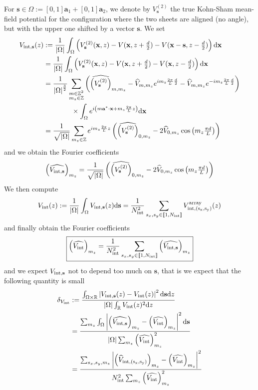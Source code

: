 \documentclass[11pt,a4paper,reqno,french,tikz]{amsart}
\def\d{{\rm d}}
\newcommand{\intent}[1]{\llbracket #1 \rrbracket}
\newcommand{\pa}[1]{\left( #1 \right)} %
\newcommand{\ab}[1]{\left|#1\right|} %
\newcommand{\f}[2]{\frac{#1}{#2}} %
\newcommand{\ind}[1]{_{\textup{#1}}} %
\def\ba{{\mathbf a}}
\def\bx{{\mathbf x}}
\def\bs{{\mathbf s}}
\newcommand{\dd}{\tfrac{d}{2}}
\begin{document}
For $\bs \in \Omega := [0,1] \ba_1 + [0,1] \ba_2$, we denote by $V^{(2)}_{\bs}$ the true Kohn-Sham mean-field potential for the configuration where the two sheets are aligned (no angle), but with the upper one shifted by a vector $\bs$. We set
\begin{align*}
	V_{\rm int, \bs}(z) &:= \f{1}{\ab{\Omega}} \int_{\Omega}  \left( V^{(2)}_{\bs}(\bx, z) - V(\bx, z + \dd) - V(\bx - \bs, z -\dd)   \right) \d \bx \\
	&= \f{1}{\ab{\Omega}} \int_{\Omega}  \left( V^{(2)}_{\bs}(\bx, z) - V(\bx, z + \dd) - V(\bx, z -\dd)   \right) \d \bx \\
    &= \f{1}{\ab{\Omega}^{\f 32}} \sum_{\substack{m \in \Z^2 \\ m_z \in \Z}}  \pa{ \widehat{\pa{V^{(2)}_{\bs}}}_{m,m_z} - \widehat{V}_{m,m_z}e^{i m_z \f{2\pi}{L} \f{d}{2}} -\widehat{V}_{m,m_z} e^{-i m_z \f{2\pi}{L} \f{d}{2}}} \\
    &\qquad \qquad \times \int_{\Omega} e^{i \pa{m \ba^* \cdot \bx + m_z \f{2\pi}{L} z}}\d \bx \\
    &= \f{1}{\sqrt{\ab{\Omega}}}\sum_{\substack{m_z \in \Z}} e^{i  m_z \f{2\pi}{L} z} \pa{ \widehat{\pa{V^{(2)}_{\bs}}}_{0,m_z} - 2 \widehat{V}_{0,m_z} \cos\pa{ m_z \tfrac{\pi d}{L} }}
\end{align*}
and we obtain the Fourier coefficients
\begin{align*}
\pa{\widehat{V_{\rm{int},\bs}}}_{m_z} =\f{1}{\sqrt{\ab{\Omega}}} \pa{\widehat{\pa{V^{(2)}_{\bs}}}_{0,m_z} - 2 \widehat{V}_{0,m_z} \cos\pa{ m_z \tfrac{\pi d}{L} }}
\end{align*}
We then compute
\begin{align*}
V\ind{int}(z) := \f{1}{\ab{\Omega}} \int_\Omega V_{\rm int, \bs}(z) \d \bs = \f{1}{N\ind{int}^2} \sum_{\substack{s_x,s_y \in \intent{1,N\ind{int}}}} V^{\rm{array}}_{\rm int, (s_x,s_y)}(z)
\end{align*}
and finally obtain the Fourier coefficients
\begin{align*}
\boxed{\pa{\widehat{V\ind{int}}}_{m_z} = \f{1}{N\ind{int}^2} \sum_{\substack{s_x,s_y \in \intent{1,N\ind{int}}}} \pa{\widehat{V_{\rm{int},\bs}}}_{m_z}}
\end{align*}
and we expect $V_{\rm{int},\bs}$ not to depend too much on $\bs$, that is we expect that the following quantity is small
\begin{align*}
	\delta_{V\ind{int}} &:= \f{\int_{\Omega\times \R} \ab{V_{\rm{int},\bs}(z) - V\ind{int}(z)}^2 \d \bs \d z}{\ab{\Omega} \int_{\R} V\ind{int}(z)^2 \d z} \\
&= \f{\sum_{m_z} \int_{\Omega} \ab{\pa{\widehat{V_{\rm{int},\bs}}}_{m_z} - \pa{\widehat{V\ind{int}}}_{m_z}}^2 \d \bs }{\ab{\Omega} \sum_{m_z}  \pa{\widehat{V\ind{int}}}_{m_z}^2} \\
&= \f{\sum_{s_x,s_y,m_z} \ab{\pa{\widehat{V}_{\rm{int},(s_x,s_y)}}_{m_z} - \pa{\widehat{V\ind{int}}}_{m_z}}^2 }{N\ind{int}^2 \sum_{m_z}  \pa{\widehat{V\ind{int}}}_{m_z}^2}
\end{align*}
\end{document}
